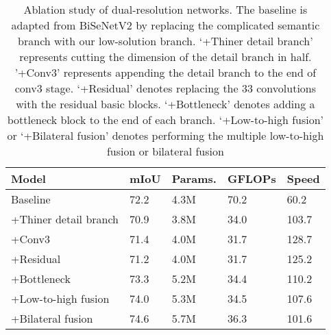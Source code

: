 \documentclass[journal]{IEEEtran}
\begin{document}
\begin{table}[]
\caption{Ablation study of dual-resolution networks. The baseline is adapted from BiSeNetV2 by replacing the complicated semantic branch with our low-solution branch. `+Thiner detail branch' represents cutting the dimension of the detail branch in half. '+Conv3' represents appending the detail branch to the end of conv3 stage. `+Residual' denotes replacing the 33 convolutions with the residual basic blocks. `+Bottleneck' denotes adding a bottleneck block to the end of each branch. `+Low-to-high fusion' or `+Bilateral fusion' denotes performing the multiple low-to-high fusion or bilateral fusion}
\label{tab:11}
\begin{tabular}{p{72pt}p{30pt}<{\centering}p{30pt}<{\centering}p{30pt}<{\centering}p{30pt}<{\centering}}
\toprule
Model                     & mIoU                & Params.              & GFLOPs      & Speed\\ \midrule
Baseline                  & 72.2                & 4.3M                & 70.2        & 60.2  \\
+Thiner detail branch     & 70.9                & 3.8M                & 34.0        & 103.7 \\
+Conv3                    & 71.4                & 4.0M                & 31.7        & 128.7 \\
+Residual                 & 71.2                & 4.0M                & 31.7        & 125.2 \\
+Bottleneck               & 73.3                & 5.2M                & 34.4        & 110.2 \\
+Low-to-high fusion       & 74.0                & 5.3M                & 34.5        & 107.6 \\
+Bilateral fusion         & 74.6                & 5.7M                & 36.3        & 101.6 \\ \bottomrule
\end{tabular}
\end{table}
\end{document}
